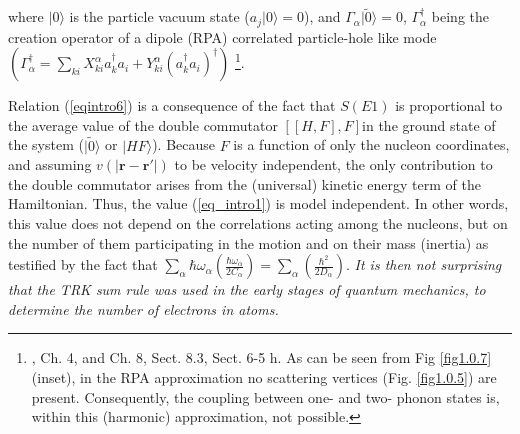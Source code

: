 where $|0\rangle$ is the particle vacuum state ($a_j|0\rangle=0$), and $\Gamma_\alpha|\tilde 0\rangle=0$, $\Gamma^\dagger_\alpha$ being the creation operator of a dipole  (RPA) correlated particle-hole like mode $(\Gamma_\alpha^\dagger=\sum_{ki}X_{ki}^\alpha a_k^\dagger a_i+Y^\alpha_{ki}(a_k^\dagger a_i)^\dagger)$ \footnote{\cite{Bertsch:05}, Ch. 4, and \cite{Brink:05} Ch. 8, Sect. 8.3, \cite{Bohr:75} Sect. 6-5 h. As can be seen from Fig  \ref{fig1.0.7} (inset), in the RPA approximation no scattering vertices (Fig. \ref{fig1.0.5}) are present. Consequently, the coupling between one- and two- phonon states is, within this (harmonic) approximation, not possible.}. 


Relation (\ref{eqintro6}) is a consequence of the fact that $S(E1)$ is proportional to the average value of the double  commutator $[[H,F],F]$in the ground state of the system ($|\tilde 0\rangle$ or $|HF\rangle$). Because $F$ is a function of only the nucleon coordinates, and assuming $v(|\mathbf{r}-\mathbf{r}'|)$ to be velocity independent, the only contribution to the double commutator arises from the (universal) kinetic energy term of the Hamiltonian. Thus, the value (\ref{eq_intro1}) is model independent. In other words, this value does not depend on the correlations acting among the nucleons, but on the number of them participating in the motion and on their mass (inertia) as testified by the fact that $\sum_{\alpha}\hbar \omega_\alpha\left(\frac{\hbar\omega_\alpha}{2C_\alpha}\right)=\sum_{\alpha}\left(\frac{\hbar^2}{2D_\alpha}\right)$. \textit{It is then not surprising that the TRK sum rule was used in the early stages of quantum mechanics, to determine the number of electrons in atoms.}

